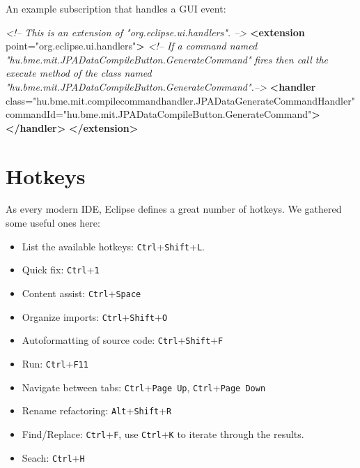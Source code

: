 \documentclass[]{report}
\newenvironment{Shaded}{}{}
\newcommand{\KeywordTok}[1]{\textcolor[rgb]{0.00,0.44,0.13}{\textbf{{#1}}}}
\newcommand{\StringTok}[1]{\textcolor[rgb]{0.25,0.44,0.63}{{#1}}}
\newcommand{\CommentTok}[1]{\textcolor[rgb]{0.38,0.63,0.69}{\textit{{#1}}}}
\newcommand{\OtherTok}[1]{\textcolor[rgb]{0.00,0.44,0.13}{{#1}}}
\begin{document}
An example subscription that handles a GUI event:

\begin{Shaded}
\begin{Highlighting}[]
\CommentTok{<!-- This is an extension of "org.eclipse.ui.handlers". -->}
\KeywordTok{<extension}
\OtherTok{   point=}\StringTok{"org.eclipse.ui.handlers"}\KeywordTok{>}
   \CommentTok{<!-- If a command named "hu.bme.mit.JPADataCompileButton.GenerateCommand"}
\CommentTok{      fires then call the execute method of the class named}
\CommentTok{      "hu.bme.mit.JPADataCompileButton.GenerateCommand".-->}
   \KeywordTok{<handler}
\OtherTok{      class=}\StringTok{"hu.bme.mit.compilecommandhandler.JPADataGenerateCommandHandler"}
\OtherTok{      commandId=}\StringTok{"hu.bme.mit.JPADataCompileButton.GenerateCommand"}\KeywordTok{>}
   \KeywordTok{</handler>}
\KeywordTok{</extension>}
\end{Highlighting}
\end{Shaded}

\section{Hotkeys}

As every modern IDE, Eclipse defines a great number of hotkeys. We
gathered some useful ones here:

\begin{itemize}
\itemsep1pt\parskip0pt
\item
  List the available hotkeys: \texttt{Ctrl}+\texttt{Shift}+\texttt{L}.
\item
  Quick fix: \texttt{Ctrl}+\texttt{1}
\item
  Content assist: \texttt{Ctrl}+\texttt{Space}
\item
  Organize imports: \texttt{Ctrl}+\texttt{Shift}+\texttt{O}
\item
  Autoformatting of source code: \texttt{Ctrl}+\texttt{Shift}+\texttt{F}
\item
  Run: \texttt{Ctrl}+\texttt{F11}
\item
  Navigate between tabs: \texttt{Ctrl}+\texttt{Page Up},
  \texttt{Ctrl}+\texttt{Page Down}
\item
  Rename refactoring: \texttt{Alt}+\texttt{Shift}+\texttt{R}
\item
  Find/Replace: \texttt{Ctrl}+\texttt{F}, use \texttt{Ctrl}+\texttt{K}
  to iterate through the results.
\item
  Seach: \texttt{Ctrl}+\texttt{H}
\end{itemize}
\end{document}
